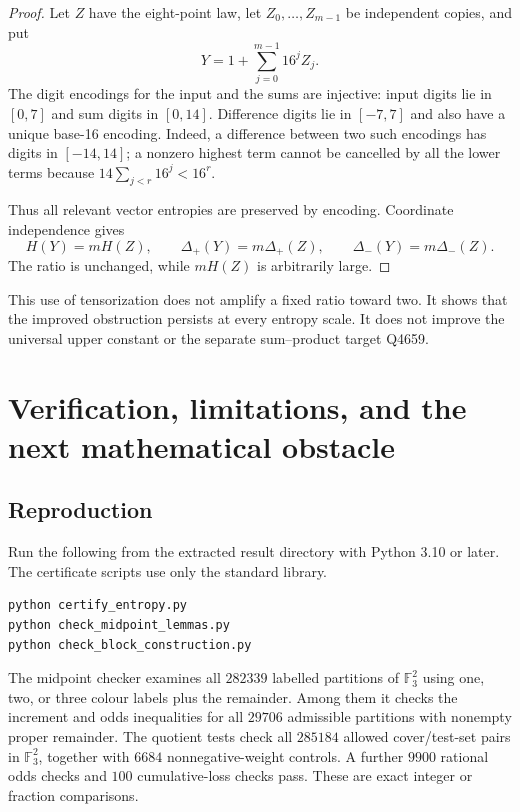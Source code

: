 \documentclass[11pt]{article}
\theoremstyle{remark}
\newcommand{\Fthree}{\mathbb F_3}
\begin{document}
\begin{proof}
Let $Z$ have the eight-point law, let $Z_0,\ldots,Z_{m-1}$ be independent
copies, and put
\[
 Y=1+\sum_{j=0}^{m-1}16^j Z_j.
\]
The digit encodings for the input and the sums are injective: input digits
lie in $[0,7]$ and sum digits in $[0,14]$. Difference digits lie in
$[-7,7]$ and also have a unique base-16 encoding. Indeed, a difference
between two such encodings has digits in $[-14,14]$; a nonzero highest
term cannot be cancelled by all the lower terms because
$14\sum_{j<r}16^j<16^r$.

Thus all relevant vector entropies are preserved by encoding. Coordinate
independence gives
\[
 H(Y)=mH(Z),\qquad
 \Delta_+(Y)=m\Delta_+(Z),\qquad
 \Delta_-(Y)=m\Delta_-(Z).
\]
The ratio is unchanged, while $mH(Z)$ is arbitrarily large.
\end{proof}

This use of tensorization does not amplify a fixed ratio toward two.
It shows that the improved obstruction persists at every entropy scale.
It does not improve the universal upper constant or the separate
sum--product target Q4659.

\section{Verification, limitations, and the next mathematical obstacle}

\subsection{Reproduction}

Run the following from the extracted result directory with Python 3.10 or
later. The certificate scripts use only the standard library.
\begin{verbatim}
python certify_entropy.py
python check_midpoint_lemmas.py
python check_block_construction.py
\end{verbatim}

The midpoint checker examines all $282339$ labelled partitions of
$\Fthree^2$ using one, two, or three colour labels plus the remainder.
Among them it checks the increment and odds inequalities for all $29706$
admissible partitions with nonempty proper remainder. The quotient tests
check all $285184$ allowed cover/test-set pairs in $\Fthree^2$, together
with $6684$ nonnegative-weight controls. A further $9900$ rational odds
checks and $100$ cumulative-loss checks pass. These are exact integer or
fraction comparisons.
\end{document}
